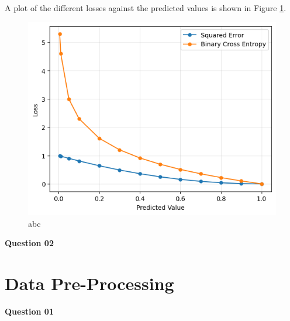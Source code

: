 \documentclass{article}[a4paper]
\begin{document}
	A plot of the different losses against the predicted values is shown in Figure \ref{q2}.

	\begin{figure}[H]
		\centering
		\includegraphics[width=0.7\linewidth]{images/q2.png}
		\caption{abc}
		\label{q2}
	\end{figure}

	\textbf{Question 02}

	\section{Data Pre-Processing}

	\textbf{Question 01}
\end{document}
